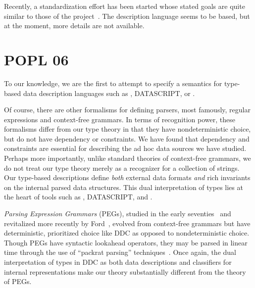 Recently, a standardization effort has been started whose stated goals are quite similar to those of the \pads{} project~\cite{dfdl}. The description
language seems to be \xml{} based, but at the moment, more details are 
not available.

\section{POPL 06}

To our knowledge, we are the first to attempt to specify a semantics for
type-based data description languages such as \packettypes{},
DATASCRIPT{}, or \pads.  

Of course, there are other formalisms for
defining parsers, most famously, regular expressions and
context-free grammars.  In terms of recognition power,
these formalisms differ from our type theory
in that they have nondeterministic choice, but do not have
dependency or constraints.  We have found that 
dependency and constraints are essential for
describing the ad hoc data sources we have studied.
Perhaps more importantly, unlike standard theories of
context-free grammars,
we do not treat our type theory merely as a recognizer for
a collection of strings.  Our type-based descriptions 
define {\em both} external data formats {\em and} 
rich invariants on %
the internal parsed data structures.  This dual interpretation
of types lies at the heart of tools such as \pads, DATASCRIPT{}, and
\packettypes{}.  

{\em Parsing Expression Grammars} (PEGs),
studied in the early seventies~\cite{birman+:parsing} and revitalized more 
recently by Ford~\cite{ford:pegs}, 
evolved from context-free grammars but
have deterministic, prioritized choice like DDC{} as opposed to
nondeterministic choice.  Though PEGs have syntactic lookahead operators,
they may be parsed in linear time through the use of
``packrat parsing'' techniques~\cite{ford:packrat,grimm:packrat}.
Once again, the dual interpretation of types in DDC{} as both
data descriptions and classifiers for internal representations
make our theory substantially different from the theory of PEGs.

